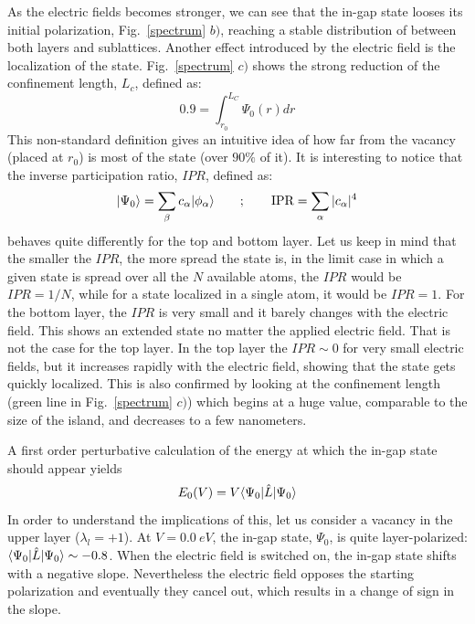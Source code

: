 As the electric fields becomes stronger, we can see that the in-gap state looses its initial polarization, Fig.~\ref{spectrum} $b)$, reaching a stable distribution of between both layers and sublattices. Another effect introduced by the electric field is the localization of the state. Fig.~\ref{spectrum} $c)$ shows the strong reduction of the confinement length, $L_c$, defined as:
\begin{equation}
  0.9 = \int_{r_0}^{L_C} \Psi_0(r) dr   %
\end{equation}
This non-standard definition gives an intuitive idea of how far from the vacancy (placed at $r_0$) is most of the state (over $90\%$ of it).
It is interesting to notice that the inverse participation ratio, $IPR$, defined as:
\begin{equation}
  |\Psi_0\rangle = \sum_\beta c_\alpha|\phi_\alpha\rangle\quad\quad;\quad\quad
  \text{IPR} = \sum_\alpha |c_\alpha|^4
\end{equation}
behaves quite differently for the top and bottom layer. Let us keep in mind that the smaller the $IPR$, the more spread the state is, in the limit case in which a given state is spread over all the $N$ available atoms, the $IPR$ would be $IPR=1/N$, while for a state localized in a single atom, it would be $IPR=1$.
For the bottom layer, the $IPR$ is very small and it barely changes with the electric field. This shows an extended state no matter the applied electric field. That is not the case for the top layer. In the top layer the $IPR\sim0$ for very small electric fields, but it increases rapidly with the electric field, showing that the state gets quickly localized. This is also confirmed by looking at the confinement length (green line in Fig.~\ref{spectrum} $c)$) which begins at a huge value, comparable to the size of the island, and decreases to a few nanometers.


A first order perturbative calculation of the energy at which the in-gap state should appear yields
\begin{equation}
  E_0 (V) = V \langle\Psi_0|\hat{L}|\Psi_0\rangle
\end{equation}
In order to understand the implications of this, let us consider a vacancy in the upper layer ($\lambda_l=+1$). At $V=\SI{0.0}{eV}$, the in-gap state, $\Psi_0$, is quite layer-polarized: $\langle\Psi_0|\hat{L}|\Psi_0\rangle\sim-0.8$. When the electric field is switched on, the in-gap state shifts with a negative slope. Nevertheless the electric field opposes the starting polarization and eventually they cancel out, which results in a change of sign in the slope. %

